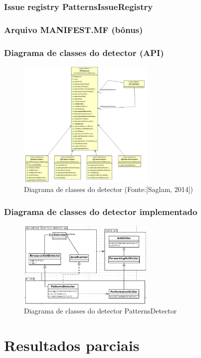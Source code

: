 \documentclass{beamer}
\begin{document}
   \frame
   {
    \frametitle{Issue registry PatternsIssueRegistry}
    
   }
   
   \frame
   {
    \frametitle{Arquivo MANIFEST.MF (bônus)}
    
   }
   
   \frame
   {
    \frametitle{Diagrama de classes do detector (API)}
    \begin{figure}
            \centering
            \includegraphics[width=6.5cm]{img/detector_class_diagram}
            \caption{Diagrama de classes do detector (Fonte:[Saglam, 2014])}
            \label{Fonte:[Saglam, 2014]}
        \end{figure}
   }
   
   \frame
   {
    \frametitle{Diagrama de classes do detector implementado}
    \begin{figure}
            \centering
            \includegraphics[width=6.5cm]{img/PatternsDetector}
            \caption{Diagrama de classes do detector PatternsDetector}
        \end{figure}
   }
   
    
\section{Resultados parciais}
\end{document}
